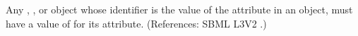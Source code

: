 Any \Compartment, \Species, \Parameter or \SpeciesReference object whose
identifier is the value of the attribute  in an
\AssignmentRule object, must have a value of  for its
 attribute.  (References: SBML L3V2
.)
